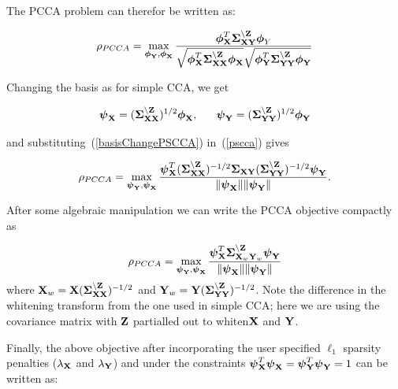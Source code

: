 \documentclass{llncs}
\newcommand{\X}{{\bf X}}
\newcommand{\Y}{{\bf Y}}
\newcommand{\Z}{{\bf Z}}
\newcommand{\bs}{\boldsymbol}
\begin{document}


The PCCA problem can therefor be written as:

\begin{equation}
\label{pscca}
\rho_{PCCA}=\max_{{\bs\phi_{\Y}}, {\bs\phi_{\X}}} \frac{\bs\phi_{\X}^T \bs\Sigma_{\X\Y}^{\backslash \Z}\bs\phi_Y}{\sqrt{\bs\phi_{\X}^T\bs\Sigma_{\X\X}^{\backslash \Z}\bs\phi_{\X}}\sqrt{\bs\phi_{\Y}^T\bs\Sigma_{\Y\Y}^{\backslash \Z}\bs\phi_{\Y}}}
\end{equation}


Changing the basis as for simple CCA, we get

\begin{equation}
\label{basisChangePSCCA}
\bs\psi_{\X} = (\bs\Sigma_{\X\X}^{\backslash \Z})^{1/2}\bs\phi_{\X}, \;\;\;\;\;\;   \bs\psi_{\Y} = (\bs\Sigma_{\Y\Y}^{\backslash \Z})^{1/2}\bs\phi_{\Y} 
\end{equation}

and substituting~(\ref{basisChangePSCCA}) in~(\ref{pscca}) gives

\begin{equation}
\label{subsPSCCA}
\rho_{PCCA}= \max_{{\bs\psi_{\Y}}, {\bs\psi_{\X}}} \frac{\bs\psi_{\X}^T (\bs\Sigma_{\X\X}^{\backslash \Z})^{-1/2}\bs\Sigma_{\X\Y}(\bs\Sigma_{\Y\Y}^{\backslash \Z})^{-1/2}\bs\psi_{\Y}}{\|\bs\psi_{\X}\| \|\bs\psi_{\Y}\|} .
\end{equation}

After some algebraic manipulation we can write the PCCA objective compactly as

\begin{equation}
\label{psccacompact}
\rho_{PCCA}=\max_{{\bs\psi_{\Y}}, {\bs\psi_{\X}}} \frac{\bs\psi_{\X}^T \bs\Sigma_{\X_w\Y_w}^{\backslash \Z}\bs\psi_{\Y}}{\|\bs\psi_{\X}\| \|\bs\psi_{\Y}\|}
\end{equation}
where $\X_w=\X(\bs\Sigma_{\X\X}^{\backslash \Z})^{-1/2}$ and
$\Y_w=\Y(\bs\Sigma_{\Y\Y}^{\backslash \Z})^{-1/2}$. Note the
difference in the whitening transform from the one used in simple CCA;
here we are using the covariance matrix with $\Z$ partialled out
to whiten$\X$ and $\Y$.


Finally, the above objective after incorporating the user specified $\ell_1$ sparsity penalties ($\lambda_{\X}$ and $\lambda_{\Y}$) and under the constraints $\bs\psi_{\X}^T\bs\psi_{\X}=\bs\psi_{\Y}^T\bs\psi_{\Y}=1$ can be written as:
\end{document}

